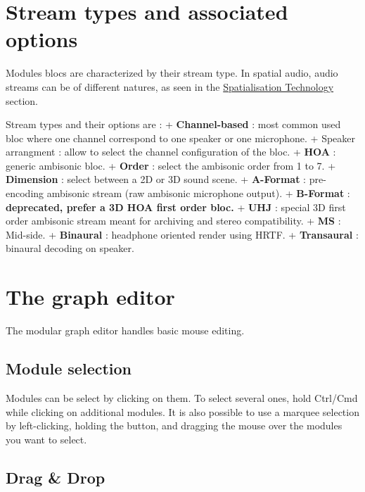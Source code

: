 \documentclass[
  letterpaper,
  DIV=11,
  numbers=noendperiod]{scrreport}
\begin{document}
\hypertarget{stream-types-and-associated-options}{%
\section{Stream types and associated
options}\label{stream-types-and-associated-options}}

Modules blocs are characterized by their stream type. In spatial audio,
audio streams can be of different natures, as seen in the
\href{}{Spatialisation Technology} section.

Stream types and their options are : + \textbf{Channel-based} : most
common used bloc where one channel correspond to one speaker or one
microphone. + Speaker arrangment : allow to select the channel
configuration of the bloc. + \textbf{HOA} : generic ambisonic bloc. +
\textbf{Order} : select the ambisonic order from 1 to 7. +
\textbf{Dimension} : select between a 2D or 3D sound scene. +
\textbf{A-Format} : pre-encoding ambisonic stream (raw ambisonic
microphone output). + \textbf{B-Format} : \textbf{deprecated, prefer a
3D HOA first order bloc.} + \textbf{UHJ} : special 3D first order
ambisonic stream meant for archiving and stereo compatibility. +
\textbf{MS} : Mid-side. + \textbf{Binaural} : headphone oriented render
using HRTF. + \textbf{Transaural} : binaural decoding on speaker.

\hypertarget{the-graph-editor}{%
\section{The graph editor}\label{the-graph-editor}}

The modular graph editor handles basic mouse editing.

\hypertarget{module-selection}{%
\subsection{Module selection}\label{module-selection}}

Modules can be select by clicking on them. To select several ones, hold
Ctrl/Cmd while clicking on additional modules. It is also possible to
use a marquee selection by left-clicking, holding the button, and
dragging the mouse over the modules you want to select.

\hypertarget{drag-drop}{%
\subsection{Drag \& Drop}\label{drag-drop}}
\end{document}
